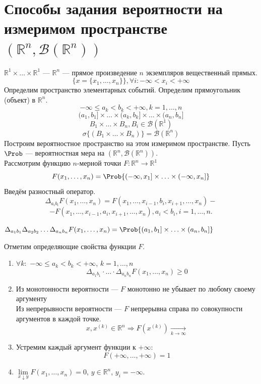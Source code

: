 \section{Способы задания вероятности на измеримом пространстве $(\mathbb{R}^n, \mathcal{B} (\mathbb{R}^n))$}
$\mathbb{R}^1 \times \ldots \times \mathbb{R}^1$ --- $\mathbb{R}^n$ --- прямое произведение $n$ экземпляров вещественный прямых.
\[
	\{ x = \{ x_1, \ldots, x_n \} \}, \forall i: -\infty < x_i < +\infty
\]
Определим пространство элементарных событий. Определим прямоугольник (объект) в $\mathbb{R}^n$.
\[
	-\infty \leqslant a_k < b_k < +\infty, k = 1, \ldots, n
\]
\[
	(a_1, b_1] \times \ldots \times (a_k, b_k] \times \ldots \times (a_n, b_n]
\]
\[
	B_1 \times \ldots \times B_n, B_i \in \mathcal{B} (\mathbb{R}^1)
\]
\[
	\sigma \{ (B_1 \times \ldots \times B_n) \} = \mathcal{B} (\mathbb{R}^n)
\]
Построим вероятностное пространство на этом измеримом пространстве. Пусть $\Prob$ --- вероятностная мера на $(\mathbb{R}^n, \mathcal{B}(\mathbb{R}^n))$. \\
Рассмотрим функцию $n$-мерной точки $F : \mathbb{R}^n \rightarrow \mathbb{R}^1$
\begin{equation}
	F (x_1, \ldots, x_n) = \Prob \{ (-\infty, x_1] \times \ldots \times (-\infty, x_n] \}
\end{equation}
Введём разностный оператор.
\[ \Delta_{a_i b_i} F(x_1, \ldots, x_n) = F(x_1, \ldots, x_{i-1}, b_i, x_{i+1}, \ldots, x_n) - \]
\[ - F(x_1, \ldots, x_{i-1}, a_i, x_{i+1}, \ldots, x_n), a_i < b_i, i = 1, \ldots, n. \]
\begin{example}
	$\Delta_{a_1 b_1} \Delta_{a_2 b_2} \ldots \Delta_{a_n b_n} F(x_1, \ldots, x_n) = \Prob \{(a_1, b_1] \times \ldots \times (a_n, b_n] \}$
\end{example}
Отметим определяющие свойства функции $F$.
\begin{enumerate}
	\item $\forall k :$ $-\infty \leqslant a_k < b_k < +\infty$, $k = 1, \ldots, n$
	\[
		\Delta_{a_1 b_1} \cdot \ldots \cdot \Delta_{a_n b_n} F(x_1, \ldots, x_n) \geqslant 0
	\]
	\item Из монотонности вероятности --- $F$ монотонно не убывает по любому своему аргументу \\
	Из непрерывности вероятности --- $F$ непрерывна справа по совокупности аргументов в каждой точке.
	\[
		x, x^{(k)} \in \mathbb{R}^n \Rightarrow F(x^{(k)}) \underset{k \to \infty}{\rightarrow}
	\]
	\item Устремим каждый аргумент функции к $+\infty$:
	\[
		F(+\infty, \ldots, +\infty) = 1
	\]
	\item $\lim\limits_{x \downarrow y} F (x_1, \ldots, x_n) = 0$, $y \in \mathbb{R}^n$, $y_i = -\infty$.
\end{enumerate}
